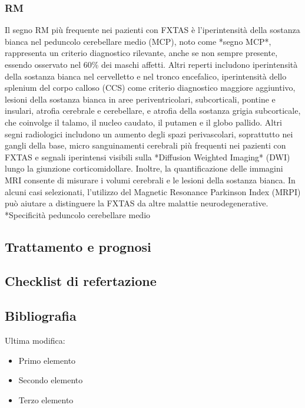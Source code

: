 \subsubsection{RM}
Il segno RM più frequente nei pazienti con FXTAS è l'iperintensità della sostanza bianca nel peduncolo cerebellare medio (MCP), noto come *segno MCP*, rappresenta un criterio diagnostico rilevante, anche se non sempre presente, essendo osservato nel 60\% dei maschi affetti. Altri reperti includono iperintensità della sostanza bianca nel cervelletto e nel tronco encefalico, iperintensità dello splenium del corpo calloso (CCS) come criterio diagnostico maggiore aggiuntivo, lesioni della sostanza bianca in aree periventricolari, subcorticali, pontine e insulari, atrofia cerebrale e cerebellare, e atrofia della sostanza grigia subcorticale, che coinvolge il talamo, il nucleo caudato, il putamen e il globo pallido. Altri segni radiologici includono un aumento degli spazi perivascolari, soprattutto nei gangli della base, micro sanguinamenti cerebrali più frequenti nei pazienti con FXTAS e segnali iperintensi visibili sulla *Diffusion Weighted Imaging* (DWI) lungo la giunzione corticomidollare. Inoltre, la quantificazione delle immagini MRI consente di misurare i volumi cerebrali e le lesioni della sostanza bianca. In alcuni casi selezionati, l'utilizzo del Magnetic Resonance Parkinson Index (MRPI) può aiutare a distinguere la FXTAS da altre malattie neurodegenerative.
*Specificità peduncolo cerebellare medio

\subsection{Trattamento e prognosi}

\subsection{Checklist di refertazione}

\subsection{Bibliografia}
\small{
	
	
}

{\tiny Ultima modifica: \filemodprintdate{\jobname}}


\begin{itemize}[label=$\square$] %
	\item Primo elemento
	\item Secondo elemento
	\item Terzo elemento
\end{itemize}